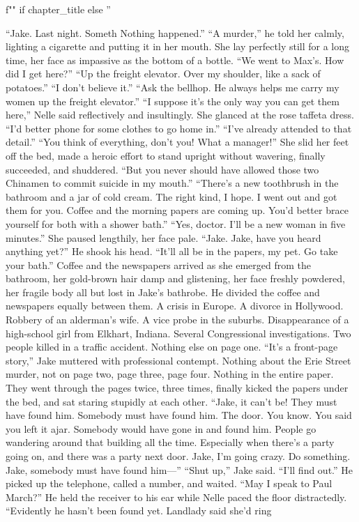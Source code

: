 \documentclass{novel}
\begin{document}
\begin{ChapterStart}
\vspace{3\nbs}
f"" if chapter_title else ''
\end{ChapterStart}

“Jake. Last night. Someth Nothing happened.” “A murder,” he told her calmly, lighting a cigarette and putting it in her mouth. She lay perfectly still for a long time, her face as impassive as the bottom of a bottle. “We went to Max’s. How did I get here?” “Up the freight elevator. Over my shoulder, like a sack of potatoes.” “I don’t believe it.” “Ask the bellhop. He always helps me carry my women up the freight elevator.” “I suppose it’s the only way you can get them here,” Nelle said reflectively and insultingly. She glanced at the rose taffeta dress. “I’d better phone for some clothes to go home in.” “I’ve already attended to that detail.” “You think of everything, don’t you! What a manager!” She slid her feet off the bed, made a heroic effort to stand upright without wavering, finally succeeded, and shuddered. “But you never should have allowed those two Chinamen to commit suicide in my mouth.” “There’s a new toothbrush in the bathroom and a jar of cold cream. The right kind, I hope. I went out and got them for you. Coffee and the morning papers are coming up. You’d better brace yourself for both with a shower bath.” “Yes, doctor. I’ll be a new woman in five minutes.” She paused lengthily, her face pale. “Jake. Jake, have you heard anything yet?” He shook his head. “It’ll all be in the papers, my pet. Go take your bath.” Coffee and the newspapers arrived as she emerged from the bathroom, her gold-brown hair damp and glistening, her face freshly powdered, her fragile body all but lost in Jake’s bathrobe. He divided the coffee and newspapers equally between them. A crisis in Europe. A divorce in Hollywood. Robbery of an alderman’s wife. A vice probe in the suburbs. Disappearance of a high-school girl from Elkhart, Indiana. Several Congressional investigations. Two people killed in a traffic accident. Nothing else on page one. “It’s a front-page story,” Jake muttered with professional contempt. Nothing about the Erie Street murder, not on page two, page three, page four. Nothing in the entire paper. They went through the pages twice, three times, finally kicked the papers under the bed, and sat staring stupidly at each other. “Jake, it can’t be! They must have found him. Somebody must have found him. The door. You know. You said you left it ajar. Somebody would have gone in and found him. People go wandering around that building all the time. Especially when there’s a party going on, and there was a party next door. Jake, I’m going crazy. Do something. Jake, somebody must have found him—” “Shut up,” Jake said. “I'll find out.” He picked up the telephone, called a number, and waited. “May I speak to Paul March?” He held the receiver to his ear while Nelle paced the floor distractedly. “Evidently he hasn’t been found yet. Landlady said she’d ring 
\end{document}
